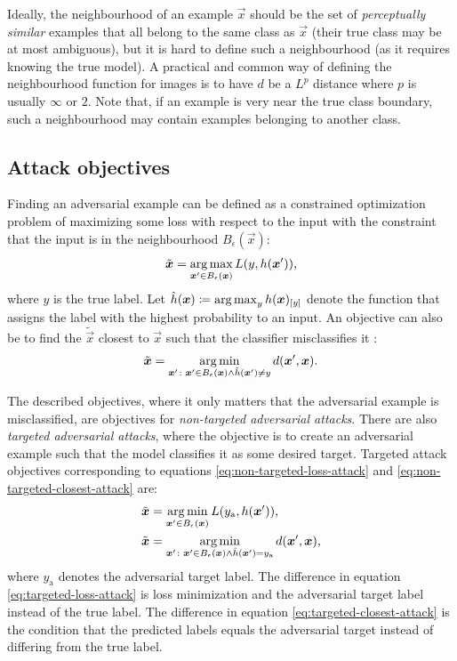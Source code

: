 \documentclass[conference,compsoc]{IEEEtran}
\begin{document}
Ideally, the neighbourhood of an example $\vec x$ should be the set of \textit{perceptually similar} examples that all belong to the same class as $\vec x$ (their true class may be at most ambiguous), but it is hard to define such a neighbourhood (as it requires knowing the true model). A practical and common way of defining the neighbourhood function for images is to have $d$ be a $L^p$ distance where $p$ is usually $\infty$ or $2$. Note that, if an example is very near the true class boundary, such a neighbourhood may contain examples belonging to another class. 

\subsection{Attack objectives}

Finding an adversarial example can be defined as a constrained optimization problem of maximizing some loss with respect to the input with the constraint that the input is in the neighbourhood $B_\epsilon(\vec x)$:
\begin{align}
    \tilde{\vec x} = \argmax_{\vec x'\in B_\epsilon(\vec x)} L(y, h(\vec x')) \text{,} \label{eq:non-targeted-loss-attack}
\end{align}
where $y$ is the true label. Let $\hat{h}(\vec x) \coloneqq \argmax_{y} h(\vec x)_\ind{y}$ denote the function that assigns the label with the highest probability to an input.
An objective can also be to find the $\tilde{\vec x}$ closest to $\vec x$ such that the classifier misclassifies it \citep{Moosavi-Dezfooli:2016:DFSAMFDNN}:
\begin{align}
    \tilde{\vec x} = \argmin_{\vec x'\colon \vec x'\in B_\epsilon(\vec x) \land \hat{h}(\vec x') \neq y} d(\vec x', \vec x) \text{.} \label{eq:non-targeted-closest-attack}
\end{align}

The described objectives, where it only matters that the adversarial example is misclassified, are objectives for \textit{non-targeted adversarial attacks}. There are also \textit{targeted adversarial attacks}, where the objective is to create an adversarial example such that the model classifies it as some desired target. Targeted attack objectives corresponding to equations \eqref{eq:non-targeted-loss-attack} and \eqref{eq:non-targeted-closest-attack} are:
\begin{align}
    \tilde{\vec x} &= \argmin_{\vec x'\in B_\epsilon(\vec x)} L(y_\text{a}, h(\vec x')) \text{,} \label{eq:targeted-loss-attack} \\
    \tilde{\vec x} &= \argmin_{\vec x'\colon \vec x'\in B_\epsilon(\vec x) \land \hat{h}(\vec x') = y_\text{a}} d(\vec x', \vec x) \text{,} \label{eq:targeted-closest-attack}
\end{align}
where $y_\text{a}$ denotes the adversarial target label. The difference in equation \eqref{eq:targeted-loss-attack} is loss minimization and the adversarial target label instead of the true label. The difference in equation \eqref{eq:targeted-closest-attack} is the condition that the predicted labels equals the adversarial target instead of differing from the true label.
\end{document}
